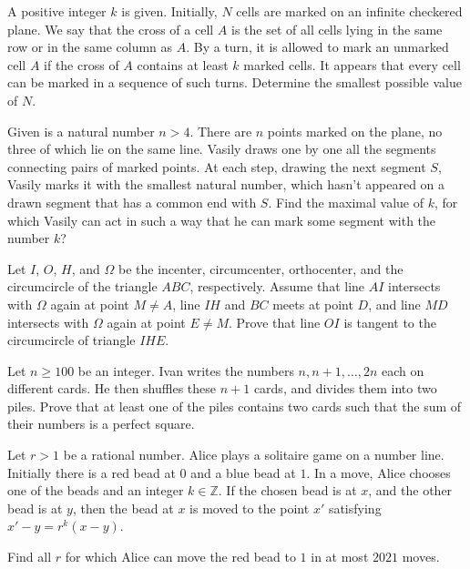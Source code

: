 \documentclass[11pt]{scrartcl}
\begin{document}
\begin{problem}[6183425212304704085]
	A positive integer $k$ is given. Initially, $N$ cells are marked on an infinite checkered plane. We say that the cross of a cell $A$ is the set of all cells lying in the same row or in the same column as $A$. By a turn, it is allowed to mark an unmarked cell $A$ if the cross of $A$ contains at least $k$ marked cells. It appears that every cell can be marked in a sequence of such turns. Determine the smallest possible value of $N$.
\end{problem}
\begin{problem}[4218160072471349910]
Given is a natural number $n>4$. There are $n$ points marked on the plane, no three of which lie on the same line. Vasily draws one by one all the segments connecting pairs of marked points. At each step, drawing the next segment $S$, Vasily marks it with the smallest natural number, which hasn't appeared on a drawn segment that has a common end with $S$. Find the maximal value of $k$, for which Vasily can act in such a way that he can mark some segment with the number $k$?
\end{problem}
\begin{problem}[183354438240037]
Let $I$, $O$, $H$, and $\Omega$ be the incenter, circumcenter, orthocenter, and the circumcircle of the triangle $ABC$, respectively. Assume that line $AI$ intersects with $\Omega$ again at point $M\neq A$, line $IH$ and $BC$ meets at point $D$, and line $MD$ intersects with $\Omega$ again at point $E\neq M$. Prove that line $OI$ is tangent to the circumcircle of triangle $IHE$.
\end{problem}
\begin{problem}[258585206260584]
Let $n \geqslant 100$ be an integer. Ivan writes the numbers $n, n+1, \ldots, 2 n$ each on different cards. He then shuffles these $n+1$ cards, and divides them into two piles. Prove that at least one of the piles contains two cards such that the sum of their numbers is a perfect square.
\end{problem}
\begin{problem}[8866273454792491736]
	Let $r>1$ be a rational number. Alice plays a solitaire game on a number line. Initially there is a red bead at $0$ and a blue bead at $1$. In a move, Alice chooses one of the beads and an integer $k \in \mathbb{Z}$. If the chosen bead is at $x$, and the other bead is at $y$, then the bead at $x$ is moved to the point $x'$ satisfying $x'-y=r^k(x-y)$.

Find all $r$ for which Alice can move the red bead to $1$ in at most $2021$ moves.
\end{problem}
\end{document}
